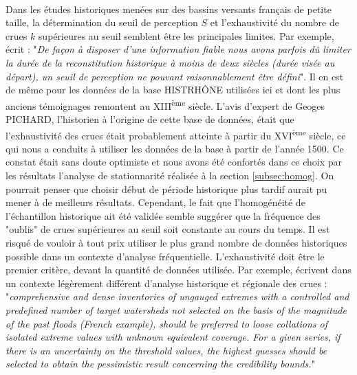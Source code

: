	\paragraph{} Dans les études historiques menées sur des bassins versants français de petite taille, la détermination du seuil de perception $S$ et l'exhaustivité du nombre de crues $k$ supérieures au seuil semblent être les principales limites. Par exemple, \citet{payrastre_possibility_2005} écrit : "\textit{De façon à disposer d'une information fiable nous avons parfois dû limiter la durée de la reconstitution historique à moins de deux siècles (durée visée au départ), un seuil de perception ne pouvant raisonnablement être défini}". Il en est de même pour les données de la base HISTRHÔNE utilisées ici et dont les plus anciens témoignages remontent au XIII\textsuperscript{ème} siècle. L'avis d'expert de Geoges PICHARD, l'historien à l'origine de cette base de données, était que l'exhaustivité des crues était probablement atteinte à partir du XVI\textsuperscript{ème} siècle, ce qui nous a conduits à utiliser les données de la base à partir de l'année 1500. Ce constat était sans doute optimiste et nous avons été confortés dans ce choix par les résultats l'analyse de stationnarité réalisée à la section \ref{subsec:homog}. On pourrait penser que choisir début de période historique plus tardif aurait pu mener à de meilleurs résultats. Cependant, le fait que l'homogénéité de l'échantillon historique ait été validée semble suggérer que la fréquence des "oublis" de crues supérieures au seuil soit constante au cours du temps. Il est risqué de vouloir à tout prix utiliser le plus grand nombre de données historiques possible dans un contexte d'analyse fréquentielle. L'exhaustivité doit être le premier critère, devant la quantité de données utilisée. Par exemple, \citet{gaume_bayesian_2010} écrivent dans un contexte légèrement différent d'analyse historique et régionale des crues : "\textit{comprehensive and dense inventories of ungauged extremes with a controlled and predefined number of target watersheds not selected on the basis of the magnitude of the past floods (French example), should be preferred to loose collations of isolated extreme values with unknown equivalent coverage. For a given series, if there is an uncertainty on the threshold values, the highest guesses should be selected to obtain the pessimistic result concerning the credibility bounds.}"
	
